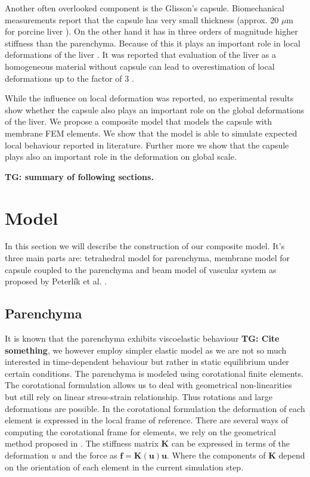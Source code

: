 \documentclass{llncs}
\newcommand{\TG}[1]{{\color{blue}\textbf{TG: #1}}}
\newcommand{\Vec}[1]{\mathbf{#1}}
\newcommand{\Mat}[1]{\mathbf{#1}}
\begin{document}
Another often overlooked component is the Glisson's capsule.
Biomechanical measurements report that the capsule has very small
thickness (approx. 20 $\mu$m for porcine liver \cite{Umale2011}).
On the other hand it has in three orders of magnitude higher stiffness than
the parenchyma.
Because of this it plays an important role in local
deformations of the liver \cite{Ahn2010,Hollenstein2006}.
It was reported that evaluation of the liver as a homogeneous material
without capsule can lead to overestimation of local deformations up to the factor of 3
\cite{Hollenstein2006}.

While the influence on local deformation was reported, no experimental
results show whether the capsule also plays an important role on the global
deformations of the liver. We propose a composite model that models the
capsule with membrane FEM elements. We show that the model is able to
simulate expected local behaviour reported in literature. Further more we
show that the capsule plays also an important role in the deformation on
global scale.

\TG{summary of following sections.}



\section{Model} %

In this section we will describe the construction of our composite model.
It's three main parts are: tetrahedral model for parenchyma, membrane model
for capsule coupled to the parenchyma and beam model of vascular system as
proposed by Peterl\'{i}k et al. \cite{Peterlik2012}.

\subsection{Parenchyma} %

It is known that the parenchyma exhibits viscoelastic behaviour \TG{Cite
something}, we however employ simpler elastic model as we are not so much
interested in time-dependent behaviour but rather in static equilibrium
under certain conditions.
%
The parenchyma is modeled using corotational finite elements. The corotational
formulation allows us to deal with geometrical non-linearities but still
rely on linear stress-strain relationship. Thus rotations and large
deformations are possible. In the corotational formulation the deformation
of each element is expressed in the local frame of reference. There are
several ways of computing the corotational frame for elements, we rely on
the geometrical method proposed in \cite{Nesme2005}.
The stiffness matrix $\Mat{K}$ can be expressed in terms of the deformation
$u$ and the force as $\Vec{f} = \Mat{K}(\Vec{u}) \Vec{u}$. Where the
components of $\Mat{K}$ depend on the orientation of each element in the
current simulation step.
\end{document}
